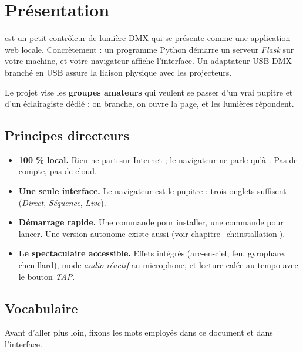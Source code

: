 
\chapter{Présentation}
\label{ch:presentation}

\Icare{} est un petit contrôleur de lumière DMX qui se présente comme une
application web locale. Concrètement : un programme Python démarre un serveur
\emph{Flask} sur votre machine, et votre navigateur affiche l'interface. Un
adaptateur USB-DMX branché en USB assure la liaison physique avec les
projecteurs.

Le projet vise les \textbf{groupes amateurs} qui veulent se passer d'un vrai
pupitre et d'un éclairagiste dédié : on branche, on ouvre la page, et les
lumières répondent.

\section{Principes directeurs}

\begin{itemize}[leftmargin=1.4em]
  \item \textbf{100 \% local.} Rien ne part sur Internet ; le navigateur ne
        parle qu'à . Pas de compte, pas de cloud.
  \item \textbf{Une seule interface.} Le navigateur est le pupitre : trois
        onglets suffisent (\emph{Direct}, \emph{Séquence}, \emph{Live}).
  \item \textbf{Démarrage rapide.} Une commande pour installer, une commande pour
        lancer. Une version  autonome existe aussi (voir
        chapitre~\ref{ch:installation}).
  \item \textbf{Le spectaculaire accessible.} Effets intégrés (arc-en-ciel, feu,
        gyrophare, chenillard), mode \emph{audio-réactif} au microphone, et
        lecture calée au tempo avec le bouton \emph{TAP}.
\end{itemize}

\section{Vocabulaire}

Avant d'aller plus loin, fixons les mots employés dans ce document et dans
l'interface.


